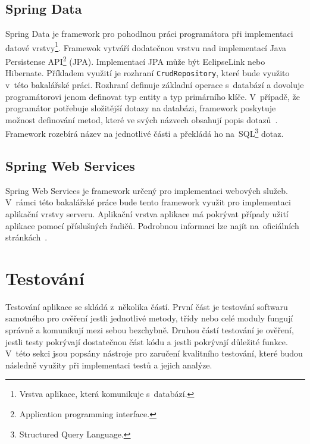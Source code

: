     \subsection{Spring Data}
        Spring Data je framework pro pohodlnou práci programátora při implementaci datové vrstvy\footnote{Vrstva aplikace, která komunikuje s~databází.}. Framewok vytváří dodatečnou vrstvu nad implementací Java Persistense API\footnote{Application programming interface.} (JPA). Implementací JPA může být EclipseLink nebo Hibernate. Příkladem využití je rozhraní \texttt{CrudRepository}, které bude využito v~této bakalářské práci. Rozhraní definuje základní operace s~databází a dovoluje programátorovi jenom definovat typ entity a typ primárního klíče. V~případě, že programátor potřebuje složitější dotazy na databázi, framework poskytuje možnost definování metod, které ve svých názvech obsahují popis dotazů~\cite{query-methods}. Framework rozebírá název na jednotlivé části a překládá ho na~SQL\footnote{Structured Query Language.} dotaz.
    
    \subsection{Spring Web Services}
        Spring Web Services je framework určený pro implementaci webových služeb. V~rámci této bakalářské práce bude tento framework využit pro implementaci aplikační vrstvy serveru. Aplikační vrstva aplikace má pokrývat případy užití aplikace pomocí příslušných řadičů. Podrobnou informaci lze najít na~oficiálních stránkách~\cite{spring-web-services}.
        

    
\section{Testování}\label{reserse:testovani}
    Testování aplikace se skládá z~několika částí. První část je testování softwaru samotného pro ověření jestli jednotlivé metody, třídy nebo celé moduly fungují správně a komunikují mezi sebou bezchybně. Druhou částí testování je ověření, jestli testy pokrývají dostatečnou část kódu a jestli pokrývají důležité funkce. V~této sekci jsou popsány nástroje pro zaručení kvalitního testování, které budou následně využity při implementaci testů a jejich analýze.
    
